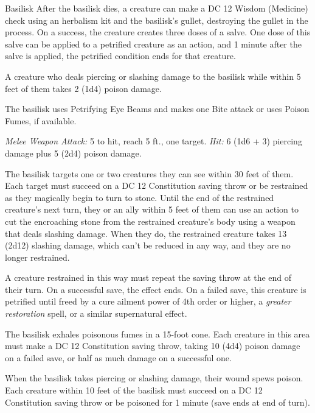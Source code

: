 \documentclass[10pt,a4paper,twoside,bg=print,twocolumn,openany,nodeprecatedcode]{dndbook}
\begin{document}
\begin{DndMonster}[float=t]{Basilisk}
\DndMonsterBasics[
armor-class = {15 (natural armor)},
hit-points = {\DndDice{10d8 + 20}},
speed = {30 ft.}
]
\DndMonsterAbilityScores[
 str = 16,
 dex = 10,
 con = 15,
 int = 2,
 wis = 8,
 cha = 7
]
\DndMonsterDetails[
damage-immunities = {poison},
condition-immunities = {petrified, poisoned},
senses = {darkvision 60 ft., passive perception 9},
challenge = 3,
]
After the basilisk dies, a creature can make a DC 12 Wisdom (Medicine) check using an herbalism kit and the basilisk's gullet, destroying the gullet in the process. On a success, the creature creates three doses of a salve. One dose of this salve can be applied to a petrified creature as an action, and 1 minute after the salve is applied, the petrified condition ends for that creature.

A creature who deals piercing or slashing damage to the basilisk while within 5 feet of them takes 2 (1d4) poison damage.

The basilisk uses Petrifying Eye Beams and makes one Bite attack or uses Poison Fumes, if available.

\textsl{Melee Weapon Attack:} 5 to hit, reach 5 ft., one target. \textsl{Hit:} 6 (1d6 + 3) piercing damage plus 5 (2d4) poison damage.

The basilisk targets one or two creatures they can see within 30 feet of them. Each target must succeed on a DC 12 Constitution saving throw or be restrained as they magically begin to turn to stone. Until the end of the restrained creature's next turn, they or an ally within 5 feet of them can use an action to cut the encroaching stone from the restrained creature's body using a weapon that deals slashing damage. When they do, the restrained creature takes 13 (2d12) slashing damage, which can't be reduced in any way, and they are no longer restrained.

A creature restrained in this way must repeat the saving throw at the end of their turn. On a successful save, the effect ends. On a failed save, this creature is petrified until freed by a cure ailment power of 4th order or higher, a \textit{greater restoration} spell, or a similar supernatural effect.

The basilisk exhales poisonous fumes in a 15-foot cone. Each creature in this area must make a DC 12 Constitution saving throw, taking 10 (4d4) poison damage on a failed save, or half as much damage on a successful one.

When the basilisk takes piercing or slashing damage, their wound spews poison. Each creature within 10 feet of the basilisk must succeed on a DC 12 Constitution saving throw or be poisoned for 1 minute (save ends at end of turn).

\end{DndMonster}
\end{document}
